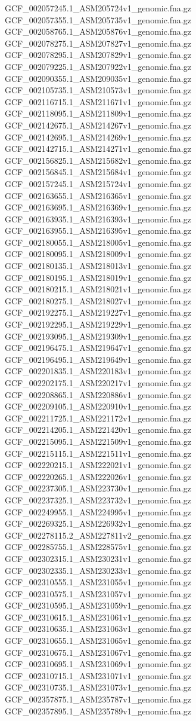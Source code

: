 \documentclass[12pt, letterpaper]{article}
\begin{document}
\begin{verbatim*}
GCF_002057245.1_ASM205724v1_genomic.fna.gz
GCF_002057355.1_ASM205735v1_genomic.fna.gz
GCF_002058765.1_ASM205876v1_genomic.fna.gz
GCF_002078275.1_ASM207827v1_genomic.fna.gz
GCF_002078295.1_ASM207829v1_genomic.fna.gz
GCF_002079225.1_ASM207922v1_genomic.fna.gz
GCF_002090355.1_ASM209035v1_genomic.fna.gz
GCF_002105735.1_ASM210573v1_genomic.fna.gz
GCF_002116715.1_ASM211671v1_genomic.fna.gz
GCF_002118095.1_ASM211809v1_genomic.fna.gz
GCF_002142675.1_ASM214267v1_genomic.fna.gz
GCF_002142695.1_ASM214269v1_genomic.fna.gz
GCF_002142715.1_ASM214271v1_genomic.fna.gz
GCF_002156825.1_ASM215682v1_genomic.fna.gz
GCF_002156845.1_ASM215684v1_genomic.fna.gz
GCF_002157245.1_ASM215724v1_genomic.fna.gz
GCF_002163655.1_ASM216365v1_genomic.fna.gz
GCF_002163695.1_ASM216369v1_genomic.fna.gz
GCF_002163935.1_ASM216393v1_genomic.fna.gz
GCF_002163955.1_ASM216395v1_genomic.fna.gz
GCF_002180055.1_ASM218005v1_genomic.fna.gz
GCF_002180095.1_ASM218009v1_genomic.fna.gz
GCF_002180135.1_ASM218013v1_genomic.fna.gz
GCF_002180195.1_ASM218019v1_genomic.fna.gz
GCF_002180215.1_ASM218021v1_genomic.fna.gz
GCF_002180275.1_ASM218027v1_genomic.fna.gz
GCF_002192275.1_ASM219227v1_genomic.fna.gz
GCF_002192295.1_ASM219229v1_genomic.fna.gz
GCF_002193095.1_ASM219309v1_genomic.fna.gz
GCF_002196475.1_ASM219647v1_genomic.fna.gz
GCF_002196495.1_ASM219649v1_genomic.fna.gz
GCF_002201835.1_ASM220183v1_genomic.fna.gz
GCF_002202175.1_ASM220217v1_genomic.fna.gz
GCF_002208865.1_ASM220886v1_genomic.fna.gz
GCF_002209105.1_ASM220910v1_genomic.fna.gz
GCF_002211725.1_ASM221172v1_genomic.fna.gz
GCF_002214205.1_ASM221420v1_genomic.fna.gz
GCF_002215095.1_ASM221509v1_genomic.fna.gz
GCF_002215115.1_ASM221511v1_genomic.fna.gz
GCF_002220215.1_ASM222021v1_genomic.fna.gz
GCF_002220265.1_ASM222026v1_genomic.fna.gz
GCF_002237305.1_ASM223730v1_genomic.fna.gz
GCF_002237325.1_ASM223732v1_genomic.fna.gz
GCF_002249955.1_ASM224995v1_genomic.fna.gz
GCF_002269325.1_ASM226932v1_genomic.fna.gz
GCF_002278115.2_ASM227811v2_genomic.fna.gz
GCF_002285755.1_ASM228575v1_genomic.fna.gz
GCF_002302315.1_ASM230231v1_genomic.fna.gz
GCF_002302335.1_ASM230233v1_genomic.fna.gz
GCF_002310555.1_ASM231055v1_genomic.fna.gz
GCF_002310575.1_ASM231057v1_genomic.fna.gz
GCF_002310595.1_ASM231059v1_genomic.fna.gz
GCF_002310615.1_ASM231061v1_genomic.fna.gz
GCF_002310635.1_ASM231063v1_genomic.fna.gz
GCF_002310655.1_ASM231065v1_genomic.fna.gz
GCF_002310675.1_ASM231067v1_genomic.fna.gz
GCF_002310695.1_ASM231069v1_genomic.fna.gz
GCF_002310715.1_ASM231071v1_genomic.fna.gz
GCF_002310735.1_ASM231073v1_genomic.fna.gz
GCF_002357875.1_ASM235787v1_genomic.fna.gz
GCF_002357895.1_ASM235789v1_genomic.fna.gz

\end{verbatim*}
\end{document}
